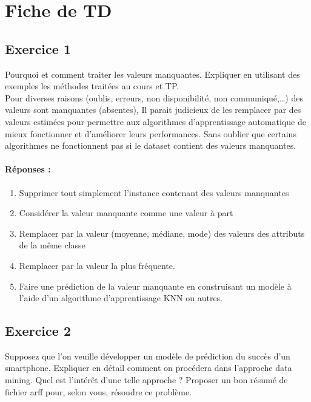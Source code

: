 \documentclass[a4paper, 12pt]{article}
\begin{document}
	\setlength{\arrayrulewidth}{0.2mm}   %
	\setlength{\tabcolsep}{12pt}          %
	\renewcommand{\arraystretch}{1.5} 
	
	
	
	\section{{\Huge Fiche de TD}}
	\subsection*{Exercice 1}Pourquoi et comment traiter les valeurs manquantes.                                  Expliquer en utilisant des exemples les méthodes traitées au cours et TP.               \\ Pour diverses raisons (oublis, erreurs, non disponibilité, non communiqué,…) des valeurs sont manquantes (absentes), Il parait judicieux de les remplacer par des valeurs estimées pour permettre aux algorithmes d’apprentissage automatique de mieux fonctionner et d’améliorer leurs performances. Sans oublier que certains algorithmes ne fonctionnent pas si le dataset contient des valeurs manquantes. 
	\paragraph{Réponses :}
	\begin{enumerate}
		\item \justifying Supprimer tout simplement l’instance contenant des valeurs manquantes 
		\item \justifying Considérer la valeur manquante comme une valeur à part
		\item \justifying Remplacer par la valeur (moyenne, médiane, mode) des valeurs des attributs de la même classe
		\item \justifying Remplacer par la valeur la plus fréquente.
		\item \justifying Faire une prédiction de la valeur manquante en construisant un modèle à l’aide d’un algorithme d’apprentissage KNN ou autres.
	\end{enumerate}
	\subsection*{Exercice 2} Supposez que l’on veuille développer un modèle de prédiction du succès d’un smartphone.  Expliquer en détail comment on procédera dans l’approche data mining.  Quel est l’intérêt d’une telle approche ?  Proposer un bon résumé de fichier arff pour, selon vous, résoudre ce problème.
\end{document}
